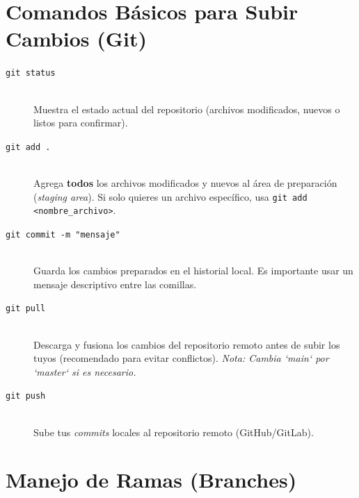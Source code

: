\documentclass[11pt]{article}
\begin{document}
\section*{Comandos Básicos para Subir Cambios (Git)}

\begin{description}
    \item[\texttt{git status}] \hfill \\
    Muestra el estado actual del repositorio (archivos modificados, nuevos o listos para confirmar).
    \item[\texttt{git add .}] \hfill \\
    Agrega \textbf{todos} los archivos modificados y nuevos al área de preparación (\textit{staging area}). Si solo quieres un archivo específico, usa \texttt{git add <nombre\_archivo>}.
    \item[\texttt{git commit -m "mensaje"}] \hfill \\
    Guarda los cambios preparados en el historial local. Es importante usar un mensaje descriptivo entre las comillas.
    \item[\texttt{git pull}] \hfill \\
    Descarga y fusiona los cambios del repositorio remoto antes de subir los tuyos (recomendado para evitar conflictos). \textit{Nota: Cambia `main` por `master` si es necesario.}
    \item[\texttt{git push}] \hfill \\
    Sube tus \textit{commits} locales al repositorio remoto (GitHub/GitLab).
\end{description}

\section*{Manejo de Ramas (Branches)}
\end{document}
